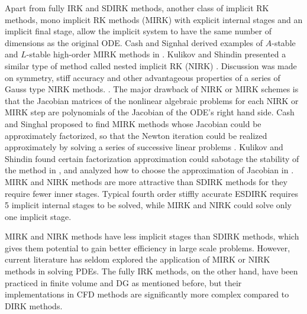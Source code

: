 \documentclass[preprint,12pt]{elsarticle}
\begin{document}
Apart from fully IRK and SDIRK methods,
another class of implicit RK methods,
mono implicit RK methods (MIRK)
\cite{cash1975classMIRKOrig}
with explicit internal stages and
an implicit final
stage, 
allow the implicit system to
have the same number of dimensions
as the original ODE.
Cash and Signhal derived examples of
$A$-stable and $L$-stable high-order
MIRK methods in
\cite{cash1977clasMIRK1,cash1982monoMIRK2}.
Kulikov and Shindin presented a similar type
of method called nested implicit RK (NIRK)
\cite{kulikov2006familyNIRKOrig}.
Discussion was made on symmetry, stiff accuracy and
other advantageous properties of a series of Gauss type
NIRK methods.
\cite{kulikov2009adaptive}.
The major drawback of NIRK or MIRK schemes is that
the Jacobian matrices of the nonlinear algebraic problems
for each NIRK or MIRK step are
polynomials of the Jacobian of the ODE's right hand side.
Cash and Singhal proposed to find MIRK methods whose
Jacobian could be approximately factorized,
so that the Newton iteration
could be realized approximately by solving a series of successive linear
problems \cite{cash1982monoMIRK2}.
Kulikov and Shindin found certain factorization
approximation could sabotage the stability of
the method in
\cite{kulikov2009adaptive},
and analyzed how to choose the approximation of
Jacobian in
\cite{kulikov2007asymptotic}.
MIRK and NIRK methods are more attractive than SDIRK methods
for they require fewer inner stages.
Typical fourth order
stiffly accurate ESDIRK requires 5 implicit internal stages to be
solved,
while MIRK and NIRK could
solve only one implicit stage.


MIRK and NIRK methods have less
implicit stages than SDIRK methods,
which gives them potential to gain better efficiency in
large scale problems.
However, current literature has seldom explored
the application of MIRK or NIRK methods in
solving PDEs.
The fully IRK methods, on the other hand,
have been practiced in
finite volume \cite{jameson2017evaluation} and
DG \cite{pazner2017stage}
as mentioned before,
but their implementations
in CFD methods are significantly more
complex compared to DIRK methods.
\end{document}
